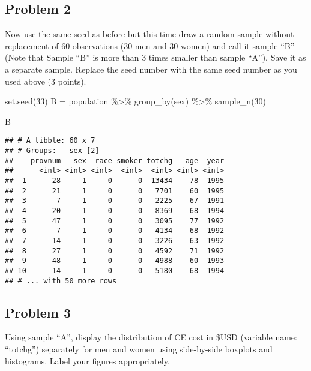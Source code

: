 \documentclass[
]{article}
\newenvironment{Shaded}{\begin{snugshade}}{\end{snugshade}}
\newcommand{\DecValTok}[1]{\textcolor[rgb]{0.00,0.00,0.81}{#1}}
\newcommand{\FunctionTok}[1]{\textcolor[rgb]{0.00,0.00,0.00}{#1}}
\newcommand{\NormalTok}[1]{#1}
\newcommand{\OtherTok}[1]{\textcolor[rgb]{0.56,0.35,0.01}{#1}}
\newcommand{\SpecialCharTok}[1]{\textcolor[rgb]{0.00,0.00,0.00}{#1}}
\begin{document}
\hypertarget{problem-2}{%
\subsection{Problem 2}\label{problem-2}}

Now use the same seed as before but this time draw a random sample
without replacement of 60 observations (30 men and 30 women) and call it
sample ``B'' (Note that Sample ``B'' is more than 3 times smaller than
sample ``A''). Save it as a separate sample. Replace the seed number
with the same seed number as you used above (3 points).

\begin{Shaded}
\begin{Highlighting}[]
\FunctionTok{set.seed}\NormalTok{(}\DecValTok{33}\NormalTok{)}
\NormalTok{B }\OtherTok{=} 
\NormalTok{  population }\SpecialCharTok{\%\textgreater{}\%} 
  \FunctionTok{group\_by}\NormalTok{(sex) }\SpecialCharTok{\%\textgreater{}\%} 
  \FunctionTok{sample\_n}\NormalTok{(}\DecValTok{30}\NormalTok{)}

\NormalTok{B}
\end{Highlighting}
\end{Shaded}

\begin{verbatim}
## # A tibble: 60 x 7
## # Groups:   sex [2]
##    provnum   sex  race smoker totchg   age  year
##      <int> <int> <int>  <int>  <int> <int> <int>
##  1      28     1     0      0  13434    78  1995
##  2      21     1     0      0   7701    60  1995
##  3       7     1     0      0   2225    67  1991
##  4      20     1     0      0   8369    68  1994
##  5      47     1     0      0   3095    77  1992
##  6       7     1     0      0   4134    68  1992
##  7      14     1     0      0   3226    63  1992
##  8      27     1     0      0   4592    71  1992
##  9      48     1     0      0   4988    60  1993
## 10      14     1     0      0   5180    68  1994
## # ... with 50 more rows
\end{verbatim}

\hypertarget{problem-3}{%
\subsection{Problem 3}\label{problem-3}}

Using sample ``A'', display the distribution of CE cost in \$USD
(variable name: ``totchg'') separately for men and women using
side-by-side boxplots and histograms. Label your figures appropriately.
\end{document}
